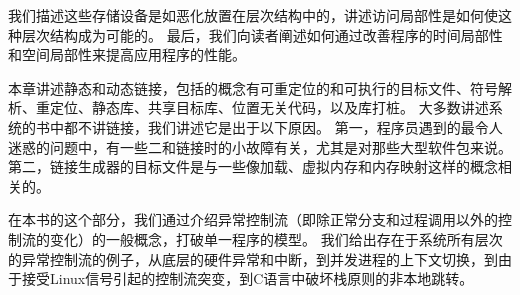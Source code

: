 {{\begin{description}
{                我们描述这些存储设备是如恶化放置在层次结构中的，讲述访问局部性是如何使这种层次结构成为可能的。
                最后，我们向读者阐述如何通过改善程序的时间局部性和空间局部性来提高应用程序的性能。
            }
            \item[第7章：链接]
            {
                本章讲述静态和动态链接，包括的概念有可重定位的和可执行的目标文件、符号解析、重定位、静态库、共享目标库、位置无关代码，以及库打桩。
                大多数讲述系统的书中都不讲链接，我们讲述它是出于以下原因。
                第一，程序员遇到的最令人迷惑的问题中，有一些二和链接时的小故障有关，尤其是对那些大型软件包来说。
                第二，链接生成器的目标文件是与一些像加载、虚拟内存和内存映射这样的概念相关的。
            }
            \item[第8章：异常控制流]
            {
                在本书的这个部分，我们通过介绍异常控制流（即除正常分支和过程调用以外的控制流的变化）的一般概念，打破单一程序的模型。
                我们给出存在于系统所有层次的异常控制流的例子，从底层的硬件异常和中断，到并发进程的上下文切换，到由于接受Linux信号引起的控制流突变，到C语言中破坏栈原则的非本地跳转。

}
\end{description}}}
